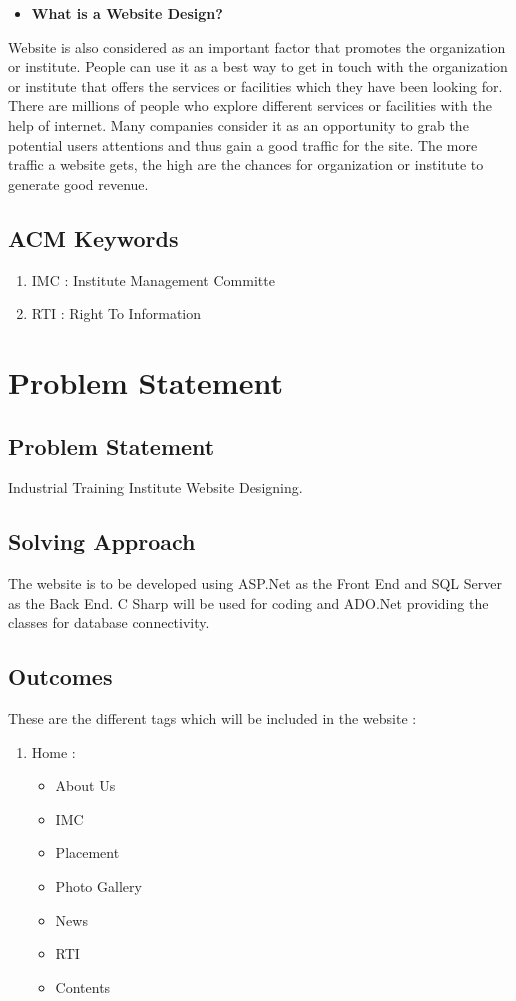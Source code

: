 \documentclass[11pt,a4paper,oneside,openright]{report}
\begin{document}
{{\begin{itemize}

\item {\bf What is a Website Design?}
\end{itemize}
\hspace{0.2in} Website is also considered as an important factor that promotes the organization or institute. People can use it as a best way to get in touch with the organization or institute that offers the services or facilities which they have been looking for. There are millions of people who explore different services or facilities with the help of internet. Many companies consider it as an opportunity to grab the potential users attentions and thus gain a good traffic for the site. The more traffic a website gets, the high are the chances for organization or institute to generate good revenue.

\section{ACM Keywords}
 \begin{enumerate}
 \item IMC : Institute Management Committe
 \item RTI : Right To Information
 \end{enumerate}


\chapter{Problem Statement}\label{chap:project outline}

\section{Problem Statement}
 Industrial Training Institute Website Designing.
\section{Solving Approach}
The website is to be developed using ASP.Net as the Front End and SQL Server as the Back End.
 C Sharp will be used for coding and ADO.Net providing the classes for database connectivity.

\section{Outcomes}
\hspace{0.2in} These are the different tags which will be included in the website :
\begin{enumerate}
\item Home :
\begin{itemize}
\item About Us
\item IMC
\item Placement
\item Photo Gallery
\item News
\item RTI
\item Contents
\end{itemize}


\end{enumerate}}}
\end{document}

